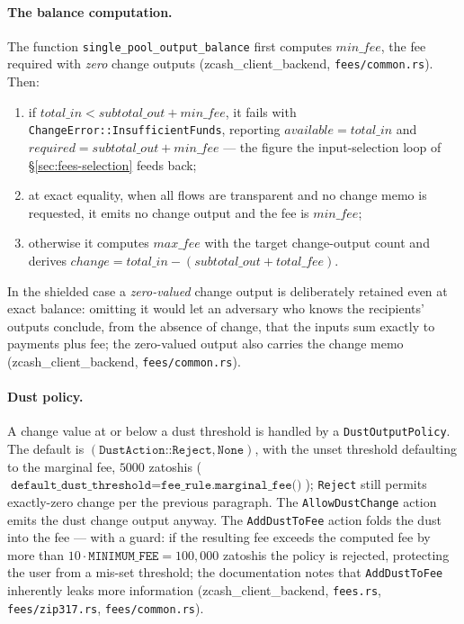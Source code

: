 \documentclass[11pt,a4paper]{article}
\theoremstyle{definition}
\begin{document}
\paragraph{The balance computation.} The function
\texttt{single\_pool\_output\_balance} first computes
$\mathit{min\_fee}$, the fee required with \emph{zero} change outputs
(\textsf{zcash\_client\_backend}, \texttt{fees/common.rs}). Then:
\begin{enumerate}[leftmargin=*]
\item if $\mathit{total\_in} < \mathit{subtotal\_out} + \mathit{min\_fee}$,
it fails with \texttt{ChangeError::InsufficientFunds}, reporting
$\mathit{available} = \mathit{total\_in}$ and
$\mathit{required} = \mathit{subtotal\_out} + \mathit{min\_fee}$ --- the
figure the input-selection loop of \S\ref{sec:fees-selection} feeds back;
\item at exact equality, when all flows are transparent and no change memo
is requested, it emits no change output and the fee is $\mathit{min\_fee}$;
\item otherwise it computes $\mathit{max\_fee}$ with the target
change-output count and derives
$\mathit{change} = \mathit{total\_in} - (\mathit{subtotal\_out} +
\mathit{total\_fee})$.
\end{enumerate}
In the shielded case a \emph{zero-valued} change output is deliberately
retained even at exact balance: omitting it would let an adversary who
knows the recipients' outputs conclude, from the absence of change, that
the inputs sum exactly to payments plus fee; the zero-valued output also
carries the change memo (\textsf{zcash\_client\_backend},
\texttt{fees/common.rs}).

\paragraph{Dust policy.} A change value at or below a dust threshold is
handled by a \texttt{DustOutputPolicy}. The default is
$(\texttt{DustAction::Reject}, \texttt{None})$, with the unset threshold
defaulting to the marginal fee, $5000$ zatoshis
($\texttt{default\_dust\_threshold} =
\texttt{fee\_rule.marginal\_fee()}$); \texttt{Reject} still permits
exactly-zero change per the previous paragraph.
The \texttt{AllowDustChange} action emits the dust change output anyway.
The \texttt{AddDustToFee} action folds the dust into the fee --- with a
guard: if the
resulting fee exceeds the computed fee by more than
$10 \cdot \texttt{MINIMUM\_FEE} = 100{,}000$ zatoshis the policy is
rejected, protecting the user from a mis-set threshold; the documentation
notes that \texttt{AddDustToFee} inherently leaks more information
(\textsf{zcash\_client\_backend}, \texttt{fees.rs},
\texttt{fees/zip317.rs}, \texttt{fees/common.rs}).
\end{document}
